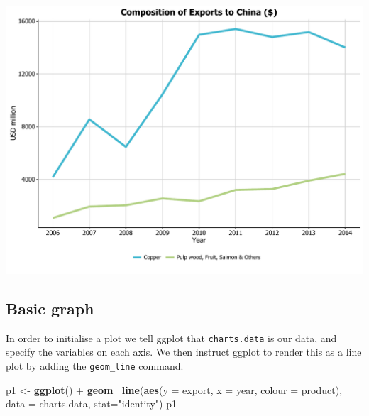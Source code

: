 \documentclass[]{article}
\newenvironment{Shaded}{\begin{snugshade}}{\end{snugshade}}
\newcommand{\KeywordTok}[1]{\textcolor[rgb]{0.13,0.29,0.53}{\textbf{{#1}}}}
\newcommand{\DataTypeTok}[1]{\textcolor[rgb]{0.13,0.29,0.53}{{#1}}}
\newcommand{\StringTok}[1]{\textcolor[rgb]{0.31,0.60,0.02}{{#1}}}
\newcommand{\NormalTok}[1]{{#1}}
\begin{document}
\begin{center}\includegraphics{0_all_posts_pdf/line_final-1} \end{center}

\subsection{Basic graph}\label{basic-graph}

In order to initialise a plot we tell ggplot that \texttt{charts.data}
is our data, and specify the variables on each axis. We then instruct
ggplot to render this as a line plot by adding the \texttt{geom\_line}
command.

\begin{Shaded}
\begin{Highlighting}[]
\NormalTok{p1 <-}\StringTok{ }\KeywordTok{ggplot}\NormalTok{() +}\StringTok{ }\KeywordTok{geom_line}\NormalTok{(}\KeywordTok{aes}\NormalTok{(}\DataTypeTok{y =} \NormalTok{export, }\DataTypeTok{x =} \NormalTok{year, }\DataTypeTok{colour =} \NormalTok{product), }
                           \DataTypeTok{data =} \NormalTok{charts.data, }\DataTypeTok{stat=}\StringTok{"identity"}\NormalTok{)}
\NormalTok{p1}
\end{Highlighting}
\end{Shaded}
\end{document}
